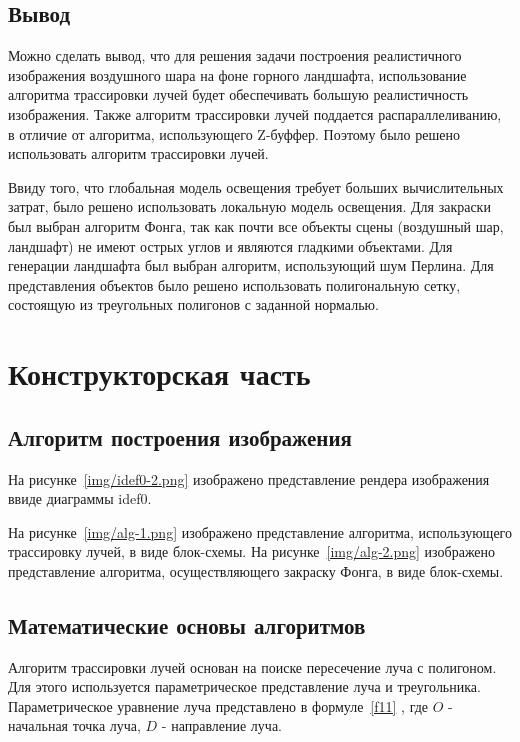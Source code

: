 
\section{Вывод}
Можно сделать вывод, что для решения задачи построения реалистичного изображения воздушного шара на фоне горного ландшафта, использование алгоритма трассировки лучей будет обеспечивать большую реалистичность изображения. Также алгоритм трассировки лучей поддается распараллеливанию, в отличие от алгоритма, использующего Z-буффер. Поэтому было решено использовать алгоритм трассировки лучей. 

Ввиду того, что глобальная модель освещения требует больших вычислительных затрат, было решено использовать локальную модель освещения. Для закраски был выбран алгоритм Фонга, так как почти все объекты сцены (воздушный шар, ландшафт) не имеют острых углов и являются гладкими объектами. Для генерации ландшафта был выбран алгоритм, использующий шум Перлина. Для представления объектов было решено использовать полигональную сетку, состоящую из треугольных полигонов с заданной нормалью.

\chapter{Конструкторская часть}
\section{Алгоритм построения изображения}
На рисунке~\ref{img/idef0-2.png} изображено представление рендера изображения ввиде диаграммы idef0.

На рисунке~\ref{img/alg-1.png} изображено представление алгоритма, использующего трассировку лучей, в виде блок-схемы. На рисунке~\ref{img/alg-2.png} изображено представление алгоритма, осуществляющего закраску Фонга, в виде блок-схемы.



\section{Математические основы алгоритмов}
Алгоритм трассировки лучей основан на поиске пересечение луча с полигоном. Для этого используется параметрическое представление луча и треугольника.
Параметрическое уравнение луча представлено в формуле~\ref{f11} \cite{sherley}, где $O$ - начальная точка луча, $D$ - направление луча.

